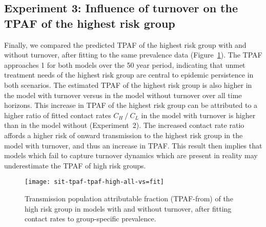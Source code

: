\subsection{Experiment 3: Influence of turnover on the TPAF of the highest risk group}
\label{ss:res-tpaf}
Finally, we compared the predicted TPAF of the highest risk group
with and without turnover, after fitting to the same prevalence data
(Figure~\ref{fig:tpaf-fit}).
The TPAF approaches 1 for both models over the 50 year period,
indicating that unmet treatment needs of the highest risk group
are central to epidemic persistence in both scenarios.
The estimated TPAF of the highest risk group is also higher
in the model with turnover versus
in the model without turnover
over all time horizons.
This increase in TPAF of the highest risk group can be attributed to
a higher ratio of fitted contact rates $C_H~/~C_L$
in the model with turnover is higher than in the model without
(Experiment~2).
The increased contact rate ratio affords
a higher risk of onward transmission to the highest risk group
in the model with turnover, and thus an increase in TPAF.
This result then implies that
models which fail to capture turnover dynamics which are present in reality
may underestimate the TPAF of high risk groups.
\begin{figure}[!tbp]
  \centering
  \texttt{[image: sit-tpaf-tpaf-high-all-vs=fit]}
  \caption{Transmission population attributable fraction (TPAF-from)
    of the high risk group in models with and without turnover,
    after fitting contact rates to group-specific prevalence.}
  \label{fig:tpaf-fit}
\end{figure}
